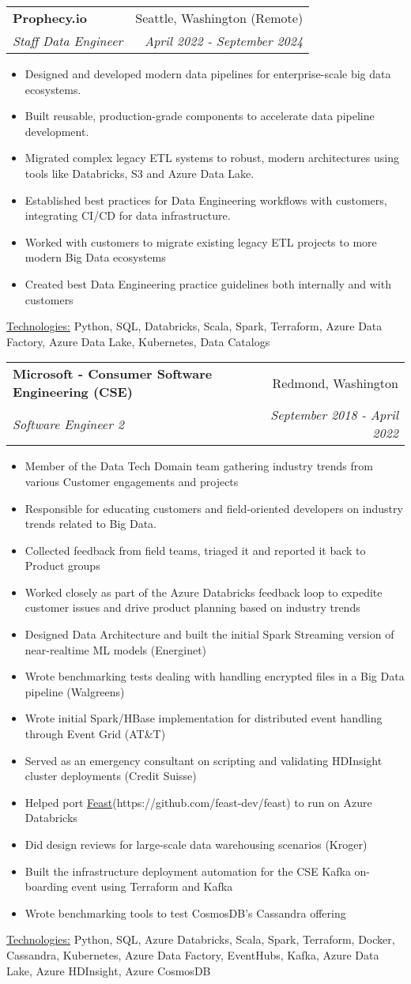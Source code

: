 \documentclass[letterpaper,11pt]{article}
\makeatletter
\newcommand{\resumeItem}[1]{%
  \item\small{
    #1
  }
}
\newcommand{\resumeSubheading}[4]{
  \vspace{8pt}\item%
    \begin{tabular*}{0.97\textwidth}[t]{l@{\extracolsep{\fill}}r}
      \textbf{#1} & #2 \\
      \textit{\small#3} & \textit{\small #4} \\
    \end{tabular*}\vspace{-5pt}
}
\newcommand{\resumeItemListStart}{\begin{itemize}}
\newcommand{\resumeItemListEnd}{\end{itemize}\vspace{-5pt}}
\newcommand{\resumeTech}[2]{
 \underline{#1:} #2
}
\makeatother
\begin{document}
    \resumeSubheading
      {Prophecy.io}{Seattle, Washington (Remote)}
      {Staff Data Engineer}{April 2022 - September 2024}
      \resumeItemListStart
      \resumeItem{Designed and developed modern data pipelines for enterprise-scale big data ecosystems.}
      \resumeItem{Built reusable, production-grade components to accelerate data pipeline development.}
      \resumeItem{Migrated complex legacy ETL systems to robust, modern architectures using tools like Databricks, S3 and Azure Data Lake.}
      \resumeItem{Established best practices for Data Engineering workflows with customers, integrating CI/CD for data infrastructure.}
      \resumeItem{Worked with customers to migrate existing legacy ETL projects to more modern Big Data ecosystems}
      \resumeItem{Created best Data Engineering practice guidelines both internally and with customers}
      \resumeItemListEnd
      \resumeTech{Technologies}{Python, SQL, Databricks, Scala, Spark, Terraform, Azure Data Factory, Azure Data Lake, Kubernetes, Data Catalogs}\\

    \newpage

    \resumeSubheading
      {Microsoft - Consumer Software Engineering (CSE)}{Redmond, Washington}
      {Software Engineer 2}{September 2018 - April 2022}
      \resumeItemListStart
      \resumeItem{Member of the Data Tech Domain team gathering industry trends from various Customer engagements and projects}
      \resumeItem{Responsible for educating customers and field-oriented developers on industry trends related to Big Data.}
      \resumeItem{Collected feedback from field teams, triaged it and reported it back to Product groups}
      \resumeItem{Worked closely as part of the Azure Databricks feedback loop to expedite customer issues and drive product planning based on industry trends}
      \resumeItem{Designed Data Architecture and built the initial Spark Streaming version of near-realtime ML models (Energinet)}
      \resumeItem{Wrote benchmarking tests dealing with handling encrypted files in a Big Data pipeline (Walgreens)}
      \resumeItem{Wrote initial Spark/HBase implementation for distributed event handling through Event Grid (AT\&T)}
      \resumeItem{Served as an emergency consultant on scripting and validating HDInsight cluster deployments (Credit Suisse)}
      \resumeItem{Helped port \href{https://github.com/feast-dev/feast}{Feast}(https://github.com/feast-dev/feast) to run on Azure Databricks}
      \resumeItem{Did design reviews for large-scale data warehousing scenarios (Kroger)}
      \resumeItem{Built the infrastructure deployment automation for the CSE Kafka on-boarding event using Terraform and Kafka}
      \resumeItem{Wrote benchmarking tools to test CosmosDB's Cassandra offering}
      \resumeItemListEnd
      \resumeTech{Technologies}{Python, SQL, Azure Databricks, Scala, Spark, Terraform, Docker, Cassandra, Kubernetes, Azure Data Factory, EventHubs, Kafka, Azure Data Lake, Azure HDInsight, Azure CosmosDB}\\
      
\end{document}
